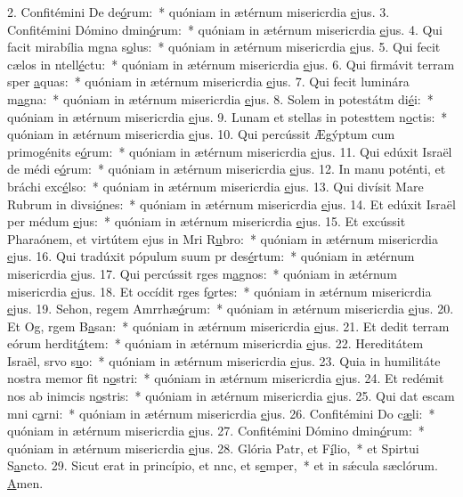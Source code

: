 2. Confitémini De de\uline{ó}rum:~* quóniam in ætérnum misericrdia \uline{e}jus.
3. Confitémini Dómino dmin\uline{ó}rum:~* quóniam in ætérnum misericrdia \uline{e}jus.
4. Qui facit mirabília mgna s\uline{o}lus:~* quóniam in ætérnum misericrdia \uline{e}jus.
5. Qui fecit cælos in ntell\uline{é}ctu:~* quóniam in ætérnum misericrdia \uline{e}jus.
6. Qui firmávit terram sper \uline{a}quas:~* quóniam in ætérnum misericrdia \uline{e}jus.
7. Qui fecit luminára m\uline{a}gna:~* quóniam in ætérnum misericrdia \uline{e}jus.
8. Solem in potestátm di\uline{é}i:~* quóniam in ætérnum misericrdia \uline{e}jus.
9. Lunam et stellas in potesttem n\uline{o}ctis:~* quóniam in ætérnum misericrdia \uline{e}jus.
10. Qui percússit Ægýptum cum primogénits e\uline{ó}rum:~* quóniam in ætérnum misericrdia \uline{e}jus.
11. Qui edúxit Israël de médi e\uline{ó}rum:~* quóniam in ætérnum misericrdia \uline{e}jus.
12. In manu poténti, et bráchi exc\uline{é}lso:~* quóniam in ætérnum misericrdia \uline{e}jus.
13. Qui divísit Mare Rubrum in divsi\uline{ó}nes:~* quóniam in ætérnum misericrdia \uline{e}jus.
14. Et edúxit Israël per médum \uline{e}jus:~* quóniam in ætérnum misericrdia \uline{e}jus.
15. Et excússit Pharaónem, et virtútem ejus in Mri R\uline{u}bro:~* quóniam in ætérnum misericrdia \uline{e}jus.
16. Qui tradúxit pópulum suum pr des\uline{é}rtum:~* quóniam in ætérnum misericrdia \uline{e}jus.
17. Qui percússit rges m\uline{a}gnos:~* quóniam in ætérnum misericrdia \uline{e}jus.
18. Et occídit rges f\uline{o}rtes:~* quóniam in ætérnum misericrdia \uline{e}jus.
19. Sehon, regem Amrrhæ\uline{ó}rum:~* quóniam in ætérnum misericrdia \uline{e}jus.
20. Et Og, rgem B\uline{a}san:~* quóniam in ætérnum misericrdia \uline{e}jus.
21. Et dedit terram eórum herdit\uline{á}tem:~* quóniam in ætérnum misericrdia \uline{e}jus.
22. Hereditátem Israël, srvo s\uline{u}o:~* quóniam in ætérnum misericrdia \uline{e}jus.
23. Quia in humilitáte nostra memor fit n\uline{o}stri:~* quóniam in ætérnum misericrdia \uline{e}jus.
24. Et redémit nos ab inimcis n\uline{o}stris:~* quóniam in ætérnum misericrdia \uline{e}jus.
25. Qui dat escam mni c\uline{a}rni:~* quóniam in ætérnum misericrdia \uline{e}jus.
26. Confitémini Do c\uline{æ}li:~* quóniam in ætérnum misericrdia \uline{e}jus.
27. Confitémini Dómino dmin\uline{ó}rum:~* quóniam in ætérnum misericrdia \uline{e}jus.
28. Glória Patr, et F\uline{í}lio,~* et Spirtui S\uline{a}ncto.
29. Sicut erat in princípio, et nnc, et s\uline{e}mper,~* et in sǽcula sæclórum. \uline{A}men.
